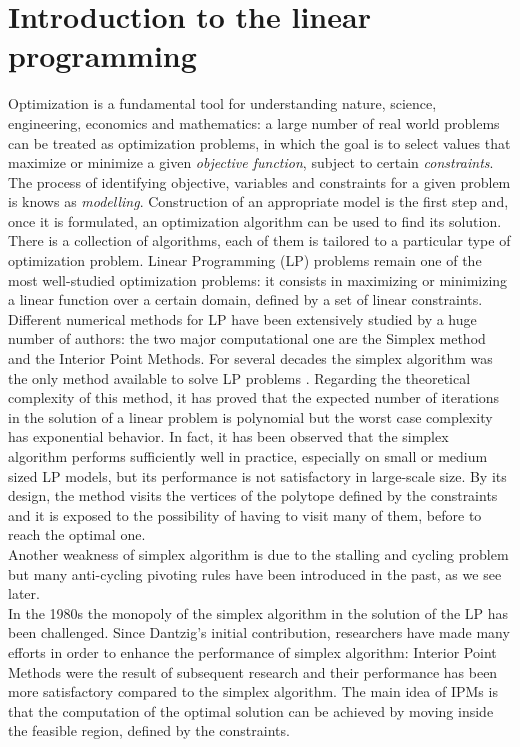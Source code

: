\documentclass[a4paper,10 pt,titlepage,twoside]{book}
\theoremstyle{plain}
\theoremstyle{definition}
\theoremstyle{remark}
\begin{document}
\chapter{Introduction to the linear programming}
Optimization is a fundamental tool for understanding nature, science, engineering, economics and mathematics: a large number of real world problems can be treated as optimization problems, in which the goal is to select values that maximize or minimize a given \textit{objective function}, subject to certain \textit{constraints}.\\ The process of identifying objective, variables and constraints for a given problem is knows as \textit{modelling}. Construction of an appropriate model is the first step and, once it is formulated, an optimization algorithm can be used to find its solution.\\ There is a collection of algorithms, each of them is tailored to a particular type of optimization problem. Linear Programming (LP) problems remain one of the most well-studied optimization problems: it consists in maximizing or minimizing a linear function over a certain domain, defined by a set of linear constraints.\\
Different numerical methods for LP have been extensively studied by a huge number of authors: the two major computational one are the Simplex method and the Interior Point Methods.
For several decades the simplex algorithm was the only method available to solve LP problems \cite{1}. Regarding the theoretical complexity of this method, it has proved that the expected number of iterations in the solution of a linear problem is polynomial but the worst case complexity has exponential behavior. In fact, it has been observed that the simplex algorithm performs sufficiently well in practice, especially on small or medium sized LP models, but its performance is not satisfactory in large-scale size. By its design, the method visits the vertices of the polytope defined by the constraints and it is exposed to the possibility of having to visit many of them, before to reach the optimal one.\\ Another weakness of simplex algorithm is due to the stalling and cycling problem but many anti-cycling pivoting rules have been introduced in the past, as we see later.\\
In the 1980s the monopoly of the simplex algorithm in the solution of the LP has been challenged. Since Dantzig's initial contribution, researchers have made many efforts in order to enhance the performance of simplex algorithm: Interior Point Methods were the result of subsequent research and their performance has been more satisfactory compared to the simplex algorithm. The main idea of IPMs is that the computation of the optimal solution can be achieved by moving inside the feasible region, defined by the constraints.\\
\end{document}
